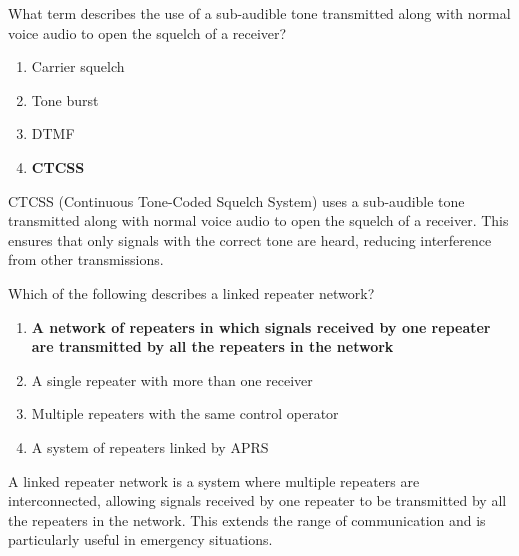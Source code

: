 
\begin{tcolorbox}[colback=gray!10!white,colframe=black!75!black,title={T2B02}]
    What term describes the use of a sub-audible tone transmitted along with normal voice audio to open the squelch of a receiver?
    \begin{enumerate}[label=\Alph*),noitemsep]
        \item Carrier squelch
        \item Tone burst
        \item DTMF
        \item \textbf{CTCSS}
    \end{enumerate}
\end{tcolorbox}
CTCSS (Continuous Tone-Coded Squelch System) uses a sub-audible tone transmitted along with normal voice audio to open the squelch of a receiver. This ensures that only signals with the correct tone are heard, reducing interference from other transmissions.


\begin{tcolorbox}[colback=gray!10!white,colframe=black!75!black,title={T2B03}]
    Which of the following describes a linked repeater network?
    \begin{enumerate}[label=\Alph*),noitemsep]
        \item \textbf{A network of repeaters in which signals received by one repeater are transmitted by all the repeaters in the network}
        \item A single repeater with more than one receiver
        \item Multiple repeaters with the same control operator
        \item A system of repeaters linked by APRS
    \end{enumerate}
\end{tcolorbox}
A linked repeater network is a system where multiple repeaters are interconnected, allowing signals received by one repeater to be transmitted by all the repeaters in the network. This extends the range of communication and is particularly useful in emergency situations.


